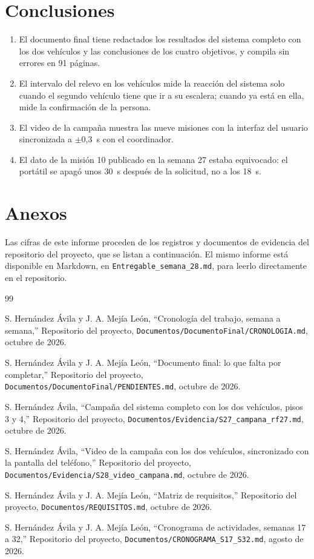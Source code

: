 \documentclass[12pt,letterpaper]{article}
\begin{document}
\section{Conclusiones}

\begin{enumerate}
    \item El documento final tiene redactados los resultados del sistema completo con los dos vehículos y las conclusiones de los cuatro objetivos, y compila sin errores en 91 páginas.
    \item El intervalo del relevo en los vehículos mide la reacción del sistema solo cuando el segundo vehículo tiene que ir a su escalera; cuando ya está en ella, mide la confirmación de la persona.
    \item El video de la campaña muestra las nueve misiones con la interfaz del usuario sincronizada a $\pm$0,3~s con el coordinador.
    \item El dato de la misión 10 publicado en la semana 27 estaba equivocado: el portátil se apagó unos 30~s después de la solicitud, no a los 18~s.
\end{enumerate}

\section{Anexos}

Las cifras de este informe proceden de los registros y documentos de evidencia del repositorio del proyecto, que se listan a continuación. El mismo informe está disponible en Markdown, en \texttt{Entregable\_semana\_28.md}, para leerlo directamente en el repositorio.

\begin{thebibliography}{99}

S. Hernández Ávila y J. A. Mejía León,
``Cronología del trabajo, semana a semana,''
Repositorio del proyecto, \texttt{Documentos/DocumentoFinal/CRONOLOGIA.md}, octubre de 2026.

S. Hernández Ávila y J. A. Mejía León,
``Documento final: lo que falta por completar,''
Repositorio del proyecto, \texttt{Documentos/DocumentoFinal/PENDIENTES.md}, octubre de 2026.

S. Hernández Ávila,
``Campaña del sistema completo con los dos vehículos, pisos 3 y 4,''
Repositorio del proyecto, \texttt{Documentos/Evidencia/S27\_campana\_rf27.md}, octubre de 2026.

S. Hernández Ávila,
``Video de la campaña con los dos vehículos, sincronizado con la pantalla del teléfono,''
Repositorio del proyecto, \texttt{Documentos/Evidencia/S28\_video\_campana.md}, octubre de 2026.

S. Hernández Ávila y J. A. Mejía León,
``Matriz de requisitos,''
Repositorio del proyecto, \texttt{Documentos/REQUISITOS.md}, octubre de 2026.

S. Hernández Ávila y J. A. Mejía León,
``Cronograma de actividades, semanas 17 a 32,''
Repositorio del proyecto, \texttt{Documentos/CRONOGRAMA\_S17\_S32.md}, agosto de 2026.

\end{thebibliography}
\end{document}
